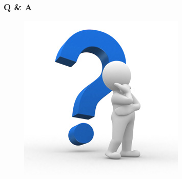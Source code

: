 \documentclass[compress]{beamer}
\begin{document}
\begin{frame}
\frametitle{Q \& A}
\begin{figure}[h!tb]
\includegraphics[height=0.7\textheight]{../resources/question.jpg}
\end{figure}
\end{frame}
\end{document}
